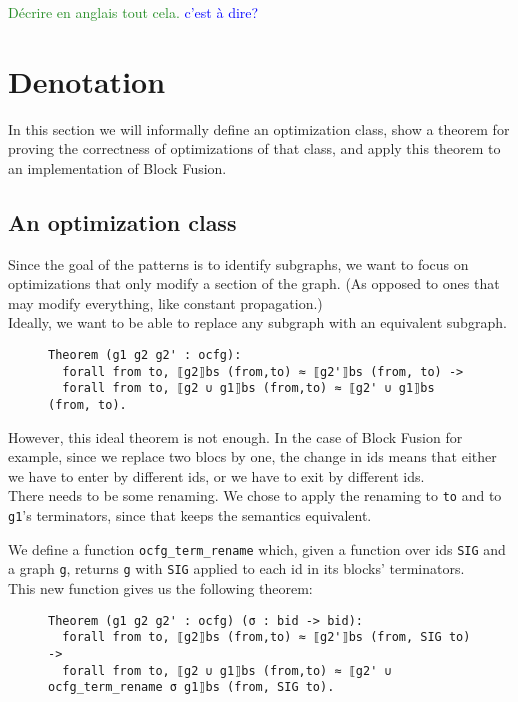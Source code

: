 \documentclass[11pt]{article}
\newcommand{\inlinecoq}[1]{\mbox{\lstinline[style=customcoq,columns=fixed,basewidth=.48em]{#1}}}
\newcommand{\ilc}[1]{\inlinecoq{#1}}
\newcommand{\leon}[1]{\textcolor{blue}{#1}}
\newcommand{\yz}[1]{\textcolor{ForestGreen}{#1}}
\begin{document}
\yz{Décrire en anglais tout cela.}
\leon{c'est à dire?}

\section{Denotation}
\label{sec:deno}

In this section we will informally define an optimization class, show a theorem for proving the correctness of optimizations of that class, and apply this theorem to an implementation of Block Fusion.

\subsection{An optimization class}

Since the goal of the patterns is to identify subgraphs, we want to focus on optimizations that only modify a section of the graph. (As opposed to ones that may modify everything, like constant propagation.)\\
Ideally, we want to be able to replace any subgraph with an equivalent subgraph.

\begin{figure}
\end{figure}
\begin{figure}
  \begin{lstlisting}[style=customcoq,basicstyle=\small\ttfamily]
Theorem (g1 g2 g2' : ocfg):
  forall from to, ⟦g2⟧bs (from,to) ≈ ⟦g2'⟧bs (from, to) ->
  forall from to, ⟦g2 ∪ g1⟧bs (from,to) ≈ ⟦g2' ∪ g1⟧bs (from, to).
  \end{lstlisting}
\end{figure}

However, this ideal theorem is not enough. In the case of Block Fusion for example, since we replace two blocs by one, the change in ids means that either we have to enter by different ids, or we have to exit by different ids.\\
There needs to be some renaming. We chose to apply the renaming to \ilc{to} and to \ilc{g1}'s terminators, since that keeps the semantics equivalent.

We define a function \ilc{ocfg_term_rename} which, given a function over ids \ilc{SIG} and a graph \ilc{g}, returns \ilc{g} with \ilc{SIG} applied to each id in its blocks' terminators.\\
This new function gives us the following theorem:
\begin{figure}
  \begin{lstlisting}[style=customcoq,basicstyle=\small\ttfamily]
Theorem (g1 g2 g2' : ocfg) (σ : bid -> bid):
  forall from to, ⟦g2⟧bs (from,to) ≈ ⟦g2'⟧bs (from, SIG to) ->
  forall from to, ⟦g2 ∪ g1⟧bs (from,to) ≈ ⟦g2' ∪ ocfg_term_rename σ g1⟧bs (from, SIG to).
  \end{lstlisting}
\end{figure}
\end{document}
